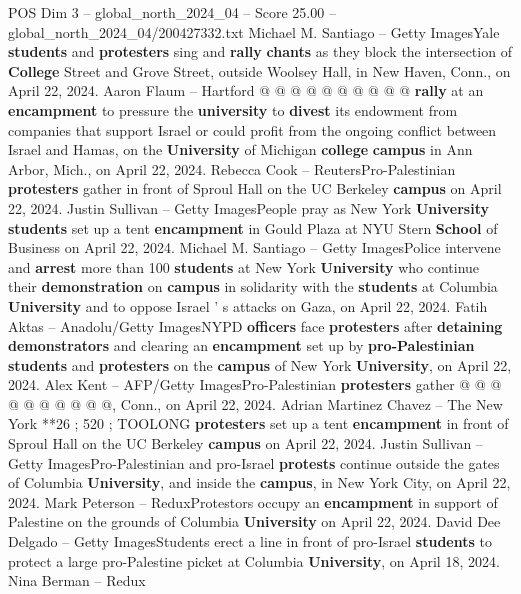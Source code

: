 \begin{textsample}{POS Dim 3 – global\_north\_2024\_04 – Score 25.00 – global\_north\_2024\_04/200427332.txt}
Michael M.
Santiago -- Getty ImagesYale \textbf{students} and \textbf{protesters} sing and \textbf{rally} \textbf{chants} as they block the intersection of \textbf{College} Street and Grove Street, outside Woolsey Hall, in New Haven, Conn., on April 22, 2024.
Aaron Flaum -- Hartford @ @ @ @ @ @ @ @ @ @ \textbf{rally} at an \textbf{encampment} to pressure the \textbf{university} to \textbf{divest} its endowment from companies that support Israel or could profit from the ongoing conflict between Israel and Hamas, on the \textbf{University} of Michigan \textbf{college} \textbf{campus} in Ann Arbor, Mich., on April 22, 2024.
Rebecca Cook -- ReutersPro-Palestinian \textbf{protesters} gather in front of Sproul Hall on the UC Berkeley \textbf{campus} on April 22, 2024.
Justin Sullivan -- Getty ImagesPeople pray as New York \textbf{University} \textbf{students} set up a tent \textbf{encampment} in Gould Plaza at NYU Stern \textbf{School} of Business on April 22, 2024.
Michael M.
Santiago -- Getty ImagesPolice intervene and \textbf{arrest} more than 100 \textbf{students} at New York \textbf{University} who continue their \textbf{demonstration} on \textbf{campus} in solidarity with the \textbf{students} at Columbia \textbf{University} and to oppose Israel ' s attacks on Gaza, on April 22, 2024.
Fatih Aktas -- Anadolu/Getty ImagesNYPD \textbf{officers} face \textbf{protesters} after \textbf{detaining} \textbf{demonstrators} and clearing an \textbf{encampment} set up by \textbf{pro-Palestinian} \textbf{students} and \textbf{protesters} on the \textbf{campus} of New York \textbf{University}, on April 22, 2024.
Alex Kent -- AFP/Getty ImagesPro-Palestinian \textbf{protesters} gather @ @ @ @ @ @ @ @ @ @, Conn., on April 22, 2024.
Adrian Martinez Chavez -- The New York **26 ; 520 ; TOOLONG \textbf{protesters} set up a tent \textbf{encampment} in front of Sproul Hall on the UC Berkeley \textbf{campus} on April 22, 2024.
Justin Sullivan -- Getty ImagesPro-Palestinian and pro-Israel \textbf{protests} continue outside the gates of Columbia \textbf{University}, and inside the \textbf{campus}, in New York City, on April 22, 2024.
Mark Peterson -- ReduxProtestors occupy an \textbf{encampment} in support of Palestine on the grounds of Columbia \textbf{University} on April 22, 2024.
David Dee Delgado -- Getty ImagesStudents erect a line in front of pro-Israel \textbf{students} to protect a large pro-Palestine picket at Columbia \textbf{University}, on April 18, 2024.
Nina Berman -- Redux

\end{textsample}
